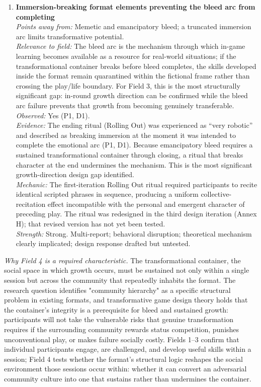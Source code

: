 \documentclass[12pt]{article}
\begin{document}
\begin{enumerate}
\item \textbf{Immersion-breaking format elements preventing the bleed arc from completing}\\
\textit{Points away from:} Memetic and emancipatory bleed; a truncated immersion arc limits transformative potential.\\
\textit{Relevance to field:} The bleed arc is the mechanism through which in-game learning becomes available as a resource for real-world situations; if the transformational container breaks before bleed completes, the skills developed inside the format remain quarantined within the fictional frame rather than crossing the play/life boundary. For Field 3, this is the most structurally significant gap: in-round growth direction can be confirmed while the bleed arc failure prevents that growth from becoming genuinely transferable.\\
\textit{Observed:} Yes (P1, D1).\\
\textit{Evidence:} The ending ritual (Rolling Out) was experienced as ``very robotic'' and described as breaking immersion at the moment it was intended to complete the emotional arc (P1, D1). Because emancipatory bleed requires a sustained transformational container through closing, a ritual that breaks character at the end undermines the mechanism. This is the most significant growth-direction design gap identified.\\
\textit{Mechanic:} The first-iteration Rolling Out ritual required participants to recite identical scripted phrases in sequence, producing a uniform collective-recitation effect incompatible with the personal and emergent character of preceding play. The ritual was redesigned in the third design iteration (Annex H); that revised version has not yet been tested.\\
\textit{Strength:} Strong. Multi-report; behavioral disruption; theoretical mechanism clearly implicated; design response drafted but untested.

\end{enumerate}

\bigskip


\noindent\textit{Why Field 4 is a required characteristic.} The transformational container, the social space in which growth occurs, must be sustained not only within a single session but across the community that repeatedly inhabits the format. The research question identifies "community hierarchy" as a specific structural problem in existing formats, and transformative game design theory holds that the container's integrity is a prerequisite for bleed and sustained growth: participants will not take the vulnerable risks that genuine transformation requires if the surrounding community rewards status competition, punishes unconventional play, or makes failure socially costly. Fields 1--3 confirm that individual participants engage, are challenged, and develop useful skills within a session; Field 4 tests whether the format's structural logic reshapes the social environment those sessions occur within: whether it can convert an adversarial community culture into one that sustains rather than undermines the container.
\end{document}
